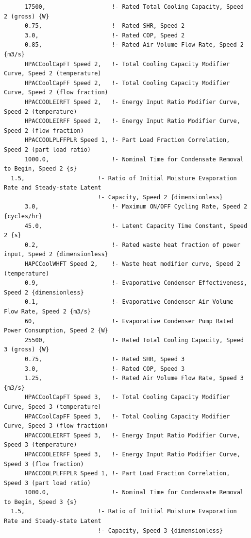\begin{lstlisting}
      17500,                   !- Rated Total Cooling Capacity, Speed 2 (gross) {W}
      0.75,                    !- Rated SHR, Speed 2
      3.0,                     !- Rated COP, Speed 2
      0.85,                    !- Rated Air Volume Flow Rate, Speed 2 {m3/s}
      HPACCoolCapFT Speed 2,   !- Total Cooling Capacity Modifier Curve, Speed 2 (temperature)
      HPACCoolCapFF Speed 2,   !- Total Cooling Capacity Modifier Curve, Speed 2 (flow fraction)
      HPACCOOLEIRFT Speed 2,   !- Energy Input Ratio Modifier Curve, Speed 2 (temperature)
      HPACCOOLEIRFF Speed 2,   !- Energy Input Ratio Modifier Curve, Speed 2 (flow fraction)
      HPACCOOLPLFFPLR Speed 1, !- Part Load Fraction Correlation, Speed 2 (part load ratio)
      1000.0,                  !- Nominal Time for Condensate Removal to Begin, Speed 2 {s}
  1.5,                     !- Ratio of Initial Moisture Evaporation Rate and Steady-state Latent
                           !- Capacity, Speed 2 {dimensionless}
      3.0,                     !- Maximum ON/OFF Cycling Rate, Speed 2 {cycles/hr}
      45.0,                    !- Latent Capacity Time Constant, Speed 2 {s}
      0.2,                     !- Rated waste heat fraction of power input, Speed 2 {dimensionless}
      HAPCCoolWHFT Speed 2,    !- Waste heat modifier curve, Speed 2 (temperature)
      0.9,                     !- Evaporative Condenser Effectiveness, Speed 2 {dimensionless}
      0.1,                     !- Evaporative Condenser Air Volume Flow Rate, Speed 2 {m3/s}
      60,                      !- Evaporative Condenser Pump Rated Power Consumption, Speed 2 {W}
      25500,                   !- Rated Total Cooling Capacity, Speed 3 (gross) {W}
      0.75,                    !- Rated SHR, Speed 3
      3.0,                     !- Rated COP, Speed 3
      1.25,                    !- Rated Air Volume Flow Rate, Speed 3 {m3/s}
      HPACCoolCapFT Speed 3,   !- Total Cooling Capacity Modifier Curve, Speed 3 (temperature)
      HPACCoolCapFF Speed 3,   !- Total Cooling Capacity Modifier Curve, Speed 3 (flow fraction)
      HPACCOOLEIRFT Speed 3,   !- Energy Input Ratio Modifier Curve, Speed 3 (temperature)
      HPACCOOLEIRFF Speed 3,   !- Energy Input Ratio Modifier Curve, Speed 3 (flow fraction)
      HPACCOOLPLFFPLR Speed 1, !- Part Load Fraction Correlation, Speed 3 (part load ratio)
      1000.0,                  !- Nominal Time for Condensate Removal to Begin, Speed 3 {s}
  1.5,                     !- Ratio of Initial Moisture Evaporation Rate and Steady-state Latent
                           !- Capacity, Speed 3 {dimensionless}

\end{lstlisting}
